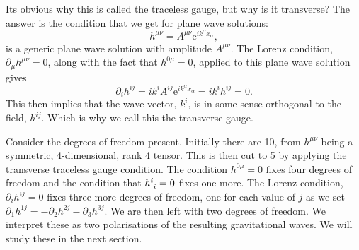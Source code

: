 \documentclass[fleqn]{NotesClass}
\newcommand*{\e}{\mathrm{e}}
\begin{document}
    Its obvious why this is called the traceless gauge, but why is it transverse?
    The answer is the condition that we get for plane wave solutions:
    \begin{equation}
        h^{\mu\nu} = A^{\mu\nu}\e^{ik^\alpha x_\alpha},
    \end{equation}
    is a generic plane wave solution with amplitude \(A^{\mu\nu}\).
    The Lorenz condition, \(\partial_\mu h^{\mu\nu} = 0\), along with the fact that \(h^{0\mu} = 0\), applied to this plane wave solution gives
    \begin{equation}
        \partial_i h^{ij} = ik^i A^{ij}\e^{ik^\alpha x_\alpha} = ik^ih^{ij} = 0.
    \end{equation}
    This then implies that the wave vector, \(k^i\), is in some sense orthogonal to the field, \(h^{ij}\).
    Which is why we call this the transverse gauge.
    
    Consider the degrees of freedom present.
    Initially there are 10, from \(h^{\mu\nu}\) being a symmetric, 4-dimensional, rank 4 tensor.
    This is then cut to 5 by applying the transverse traceless gauge condition.
    The condition \(h^{0\mu} = 0\) fixes four degrees of freedom and the condition that \(\tensor{h}{^i_i} = 0\) fixes one more.
    The Lorenz condition, \(\partial_{i}h^{ij} = 0\) fixes three more degrees of freedom, one for each value of \(j\) as we set \(\partial_1h^{1j} = -\partial_2h^{2j} - \partial_3h^{3j}\).
    We are then left with two degrees of freedom.
    We interpret these as two polarisations of the resulting gravitational waves.
    We will study these in the next section.
    
\end{document}
